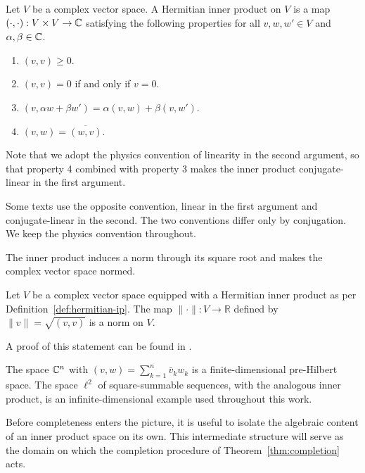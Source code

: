 \begin{definition}\label{def:hermitian-ip}
	Let $V$ be a complex vector space. A Hermitian inner product on $V$ is a map $(\cdot,\cdot): V\times V\to \mathbb{C}$ satisfying the following properties for all $v,w,w'\in V$ and $\alpha,\beta\in\mathbb{C}$.
	\begin{enumerate}
		\item $(v,v)\geq 0$.
		\item $(v,v)=0$ if and only if $v=0$.
		\item $( v,\alpha w+\beta w')=\alpha( v,w)+\beta( v,w')$.
		\item $( v,w)=\overline{( w,v)}$.
	\end{enumerate}
\end{definition}

\noindent Note that we adopt the physics convention of linearity in the second argument, so that property 4 combined with property 3 makes the inner product conjugate-linear in the first argument.

\begin{remark}
	Some texts use the opposite convention, linear in the first argument and conjugate-linear in the second. The two conventions differ only by conjugation. We keep the physics convention throughout.
\end{remark}

\noindent The inner product induces a norm through its square root and makes the complex vector space normed.

\begin{proposition}\label{prop:induced-norm}
	Let $V$ be a complex vector space equipped with a Hermitian inner product as per Definition~\ref{def:hermitian-ip}. The map $\|\cdot\|: V\to\mathbb{R}$ defined by $\|v\|=\sqrt{( v,v)}$ is a norm on $V$.
\end{proposition}

\noindent A proof of this statement can be found in \cite[Proposition 3.3]{morettiSpectralTheoryQuantum}. 
\begin{example}
	The space $\mathbb{C}^n$ with $( v,w)=\sum_{k=1}^n\bar v_kw_k$ is a finite-dimensional pre-Hilbert space. The space $\ell^2$ of square-summable sequences, with the analogous inner product, is an infinite-dimensional example used throughout this work.
\end{example}

\noindent Before completeness enters the picture, it is useful to isolate the algebraic content of an inner product space on its own. This intermediate structure will serve as the domain on which the completion procedure of Theorem~\ref{thm:completion} acts.

